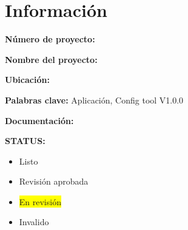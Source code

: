 \chapter{Información}
\vspace{3cm}

\noindent\Large\textbf{Número de proyecto:}\\
\vspace{5mm}

\noindent\Large\textbf{Nombre del proyecto:}\\
\vspace{5mm}

\noindent\Large\textbf{Ubicación:}\\
\vspace{5mm}

\noindent\Large\textbf{Palabras clave:} Aplicación, Config tool V1.0.0\\
\vspace{5mm}

\noindent\Large\textbf{Documentación:} \thesistitle \\
\vspace{5mm}

\noindent\LARGE\textbf{STATUS:}\\
\begin{itemize}
    \item\Large Listo
    \item\Large Revisión aprobada
    \item\Large\colorbox{yellow}{En revisión}
    \item\Large Invalido
\end{itemize}